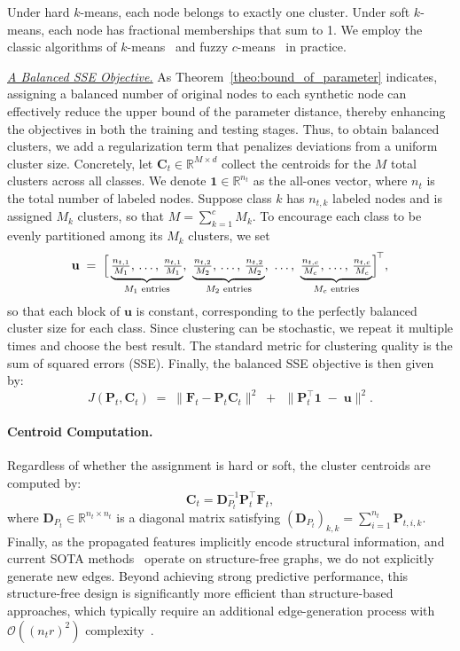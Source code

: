 Under hard \(k\)-means, each node belongs to exactly one cluster. Under soft \(k\)-means, each node has fractional memberships that sum to 1. We employ the classic algorithms of \(k\)-means~\citep{lloyd1982leastpcm} and fuzzy \(c\)-means~\citep{bezdek1984fcm} in practice.


\textit{\underline{A Balanced SSE Objective.}}
As Theorem~\ref{theo:bound_of_parameter} indicates, assigning a balanced number of original nodes to each synthetic node can effectively reduce the upper bound of the parameter distance, thereby enhancing the objectives in both the training and testing stages. Thus, to obtain balanced clusters, we add a regularization term that penalizes deviations from a uniform cluster size. Concretely, let \(\mathbf{C}_t \in \mathbb{R}^{M \times d}\) collect the centroids for the \(M\) total clusters across all classes. We denote \(\mathbf{1} \in \mathbb{R}^{n_t}\) as the all-ones vector, where \(n_t\) is the total number of labeled nodes. Suppose class \(k\) has \(n_{t,k}\) labeled nodes and is assigned \(M_k\) clusters, so that \(M = \sum_{k=1}^{c} M_k\). To encourage each class to be evenly partitioned among its \(M_k\) clusters, we set
\[
\mathbf{u} \;=\; \Bigl[\,
\underbrace{\tfrac{n_{t,1}}{M_{1}},\,\dots,\,\tfrac{n_{t,1}}{M_{1}}}_{M_{1} \text{ entries}},\ 
\underbrace{\tfrac{n_{t,2}}{M_{2}},\,\dots,\,\tfrac{n_{t,2}}{M_{2}}}_{M_{2} \text{ entries}},\ 
\dots,\ 
\underbrace{\tfrac{n_{t,c}}{M_{c}},\,\dots,\,\tfrac{n_{t,c}}{M_{c}}}_{M_{c} \text{ entries}}
\Bigr]^{\!\top},
\]
so that each block of \(\mathbf{u}\) is constant, corresponding to the perfectly balanced cluster size for each class. 
Since clustering can be stochastic, we repeat it multiple times and choose the best result. The standard metric for clustering quality is the sum of squared errors (SSE). Finally, the balanced SSE objective is then given by:
\begin{equation}
\label{eq:balanced_sse_matrix}
J(\mathbf{P}_t, \mathbf{C}_t)
\;=\;
\bigl\|\mathbf{F}_t - \mathbf{P}_t \mathbf{C}_t \bigr\|^{2}
\;+\;
\,\bigl\|\mathbf{P}_t^\top \mathbf{1} \;-\; \mathbf{u}\bigr\|^{2}.
\end{equation}


\paragraph{Centroid Computation.}
Regardless of whether the assignment is hard or soft, the cluster centroids are computed by:
\begin{equation}
\mathbf{C}_t = \mathbf{D}_{P_t}^{-1} \mathbf{P}_t^\top \mathbf{F}_{t},
\end{equation}
where \(\mathbf{D}_{P_t} \in \mathbb{R}^{n_t \times n_t}\) is a diagonal matrix satisfying $(\mathbf{D}_{P_t})_{k,k}=\sum_{i=1}^{n_t} \mathbf{P}_{t,i,k}$. Finally, as the propagated features implicitly encode structural information, and current SOTA methods~\citep{geom,sfgc} operate on structure-free graphs, we do not explicitly generate new edges. Beyond achieving strong predictive performance, this structure-free design is significantly more efficient than structure-based approaches, which typically require an additional edge-generation process with \(\mathcal{O}((n_tr)^2)\) complexity~\citep{gong2024gc4nc}.


